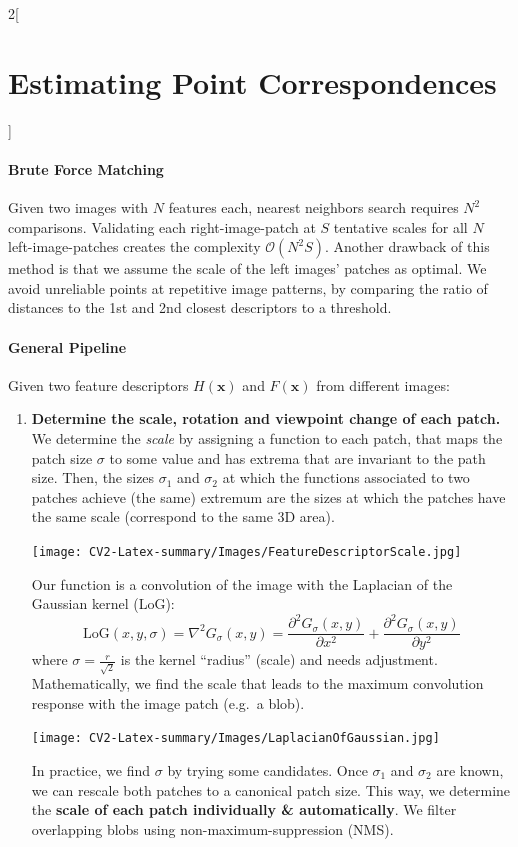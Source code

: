 \documentclass[oneside,fontsize=11pt,paper=a4]{scrartcl}
\begin{document}
\begin{multicols}{2}[\section{Estimating Point Correspondences}]
\paragraph{Brute Force Matching} Given two images with $N$ features each, nearest neighbors search requires $N^2$ comparisons. Validating each right-image-patch  at $S$ tentative scales for all $N$ left-image-patches creates  the complexity $\mathcal{O}(N^2S)$. Another drawback of this method is that we assume the scale of the left images' patches as optimal. We avoid unreliable points at repetitive image patterns, by comparing the ratio of distances to the 1st and 2nd closest descriptors to a threshold. 

\paragraph{General Pipeline} Given two feature descriptors  $H(\mathbf{x})$ and $F(\mathbf{x})$ from different images:
\begin{enumerate}
    \item \textbf{Determine the scale, rotation and viewpoint change of each patch.} We determine the \textit{scale} by assigning a function to each patch, that maps the patch size $\sigma$ to some value and has extrema that are invariant to the path size. Then, the sizes $\sigma_1$ and $\sigma_2$ at which the functions associated to two patches achieve (the same) extremum are the sizes at which the patches have the same scale (correspond to the same 3D area). 
    \begin{center}
        \texttt{[image: CV2-Latex-summary/Images/FeatureDescriptorScale.jpg]}
    \end{center}
    Our function is a convolution of the image with the Laplacian of the Gaussian kernel (LoG):
    {\small$$
        \text{LoG}(x,y,\sigma) = \nabla^2 G_\sigma(x,y) = \frac{\partial^2 G_\sigma(x,y)}{\partial x^2} + \frac{\partial^2 G_\sigma(x,y)}{\partial y^2}
    $$}
    where $\sigma=\frac{r}{\sqrt{2}}$ is the kernel ``radius'' (scale) and needs adjustment. Mathematically, we find the scale that leads to the maximum convolution response with the image patch (e.g.\ a blob).
    \begin{center}
        \texttt{[image: CV2-Latex-summary/Images/LaplacianOfGaussian.jpg]}
    \end{center}
    In practice, we find $\sigma$ by trying some candidates. Once $\sigma_1$ and $\sigma_2$ are known, we can rescale both patches to a canonical patch size. This way, we determine the \textbf{scale of each patch individually \& automatically}. We filter overlapping blobs using non-maximum-suppression (NMS). 
    

\end{enumerate}
\end{multicols}
\end{document}
